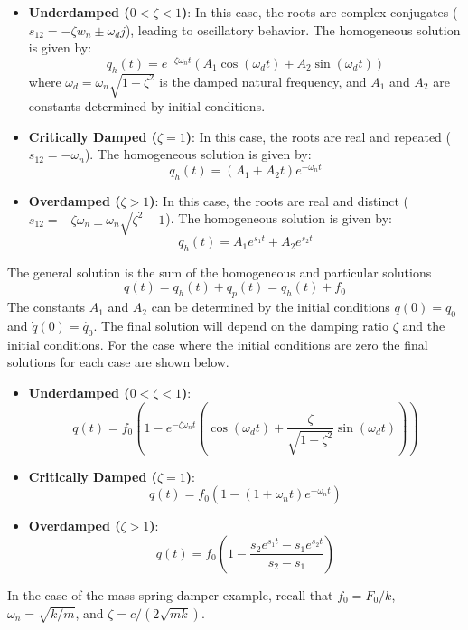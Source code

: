 \begin{itemize}
    \item {\bf Underdamped ($0<\zeta<1$)}: In this case, the roots are complex conjugates ($s_{12}=-\zeta w_n \pm \omega_d j$), leading to oscillatory behavior. The homogeneous solution is given by:
    \begin{equation}
        q_h(t) = e^{-\zeta \omega_n t} \left( A_1 \cos(\omega_d t) + A_2 \sin(\omega_d t) \right)
    \end{equation}
    where $\omega_d = \omega_n \sqrt{1 - \zeta^2}$ is the damped natural frequency, and $A_1$ and $A_2$ are constants determined by initial conditions.

    \item {\bf Critically Damped ($\zeta=1$)}: In this case, the roots are real and repeated ($s_{12}=-\omega_n$). The homogeneous solution is given by:
    \begin{equation}
        q_h(t) = (A_1 + A_2 t) e^{-\omega_n t}
    \end{equation}

    \item {\bf Overdamped ($\zeta>1$)}: In this case, the roots are real and distinct ($s_{12}=-\zeta \omega_n \pm \omega_n \sqrt{\zeta^2-1}$). The homogeneous solution is given by:
    \begin{equation}
        q_h(t) = A_1 e^{s_1 t} + A_2 e^{s_2 t}
    \end{equation}
\end{itemize}
The general solution is the sum of the homogeneous and particular solutions
\begin{equation}
    q(t) = q_h(t) + q_p(t) = q_h(t) + f_0
\end{equation}
The constants $A_1$ and $A_2$ can be determined by the initial conditions $q(0)=q_0$ and $\dot{q}(0)=\dot{q_0}$. The final solution will depend on the damping ratio $\zeta$ and the initial conditions. For the case where the initial conditions are zero the final solutions for each case are shown below.
\begin{itemize}
    \item {\bf Underdamped ($0<\zeta<1$)}:
    \begin{equation}
        q(t) = f_0 \left( 1 - e^{-\zeta \omega_n t} \left( \cos(\omega_d t) + \frac{\zeta}{\sqrt{1-\zeta^2}} \sin(\omega_d t) \right) \right)
    \end{equation}
    \item {\bf Critically Damped ($\zeta=1$)}:
    \begin{equation}
        q(t) = f_0 \left( 1 - (1 + \omega_n t) e^{-\omega_n t} \right)
    \end{equation}
    \item {\bf Overdamped ($\zeta>1$)}:
    \begin{equation}
        q(t) = f_0 \left( 1 - \frac{s_2 e^{s_1 t} - s_1 e^{s_2 t}}{s_2 - s_1} \right)
    \end{equation}
\end{itemize}
In the case of the mass-spring-damper example, recall that $f_0=F_0/k$, $\omega_n = \sqrt{k/m}$, and $\zeta = c/(2\sqrt{mk})$.


